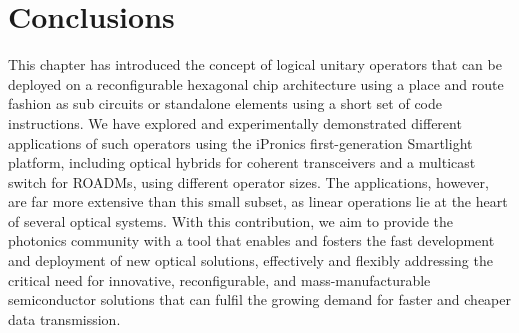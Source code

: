 
\section{Conclusions}
This chapter has introduced the concept of logical unitary operators that can be deployed on a reconfigurable hexagonal chip architecture using a place and route fashion as sub circuits or standalone elements using a short set of code instructions.
We have explored and experimentally demonstrated different applications of such operators using the iPronics first-generation Smartlight platform, including optical hybrids for coherent transceivers and a multicast switch for ROADMs, using different operator sizes.
The applications, however, are far more extensive than this small subset, as linear operations lie at the heart of several optical systems.
With this contribution, we aim to provide the photonics community with a tool that enables and fosters the fast development and deployment of new optical solutions, effectively and flexibly addressing the critical need for innovative, reconfigurable, and mass-manufacturable semiconductor solutions that can fulfil the growing demand for faster and cheaper data transmission.

